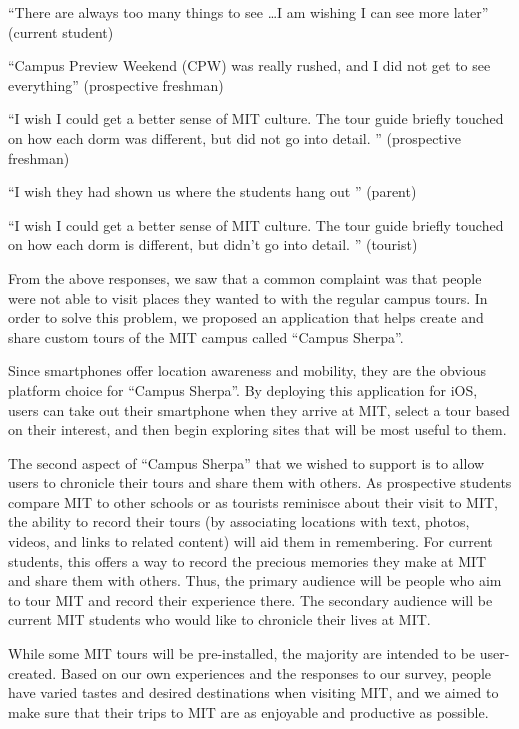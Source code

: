 \documentclass{sigchi}
\begin{document}
``There are always too many things to see \ldots I am wishing I can see more later'' (current student)

``Campus Preview Weekend (CPW) was really rushed, and I did not get to see everything'' (prospective freshman)

``I wish I could get a better sense of MIT culture. The tour guide briefly touched on how each dorm was different, but did not go into detail. '' (prospective freshman)

``I wish they had shown us where the students hang out '' (parent)

``I wish I could get a better sense of MIT culture. The tour guide briefly touched on how each dorm is different, but didn't go into detail. '' (tourist)

From the above responses, we saw that a common complaint was that people were not able to visit places they wanted to with the regular campus tours. In order to solve this problem, we proposed an application that helps create and share custom tours of the MIT campus called ``Campus Sherpa''.

Since smartphones offer location awareness and mobility, they are the obvious platform choice for ``Campus Sherpa''. By deploying this application for iOS, users can take out their smartphone when they arrive at MIT, select a tour based on their interest, and then begin exploring sites that will be most useful to them.

The second aspect of ``Campus Sherpa'' that we wished to support is to allow users to chronicle their tours and share them with others. As prospective students compare MIT to other schools or as tourists reminisce about their visit to MIT, the ability to record their tours (by associating locations with text, photos, videos, and links to related content) will aid them in remembering. For current students, this offers a way to record the precious memories they make at MIT and share them with others. Thus, the primary audience will be people who aim to tour MIT and record their experience there. The secondary audience will be current MIT students who would like to chronicle their lives at MIT.

While some MIT tours will be pre-installed, the majority are intended to be user-created.
Based on our own experiences and the responses to our survey, people have varied tastes and desired destinations when visiting MIT, and we aimed to make sure that their trips to MIT are as enjoyable and productive as possible.
\end{document}
